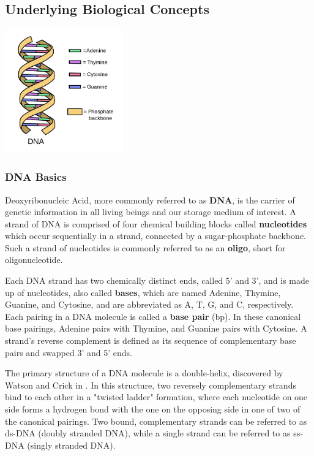 \documentclass[a4paper,conference]{IEEEtran}
\begin{document}

 

\subsection{Underlying Biological Concepts}

\begin{center}
\includegraphics[width=2in]{dna}
\end{center}


\subsubsection{DNA Basics}
Deoxyribonucleic Acid, more commonly referred to as \textbf{DNA}, is the carrier of genetic information in all living beings and our storage medium of interest. A strand of DNA is comprised of four chemical building blocks called \textbf{nucleotides} which occur sequentially in a strand, connected by a sugar-phosphate backbone. Such a strand of nucleotides is commonly referred to as an \textbf{oligo}, short for oligonucleotide.

Each DNA strand has two chemically distinct ends, called 5' and 3', and is made up of nucleotides, also called \textbf{bases}, which are named Adenine, Thymine, Guanine, and Cytosine, and are abbreviated as A, T, G, and C, respectively. Each pairing in a DNA molecule is called a \textbf{base pair} (bp). In these canonical base pairings, Adenine pairs with Thymine, and Guanine pairs with Cytosine. A strand's reverse complement is defined as its sequence of complementary base pairs and swapped 3' and 5' ends.

The primary structure of a DNA molecule is a double-helix, discovered by Watson and Crick in \cite{3}. In this structure, two reversely complementary strands bind to each other in a "twisted ladder" formation, where each nucleotide on one side forms a hydrogen bond with the one on the opposing side in one of two of the canonical pairings. Two bound, complementary strands can be referred to as ds-DNA (doubly stranded DNA), while a single strand can be referred to as ss-DNA (singly stranded DNA).
\end{document}
